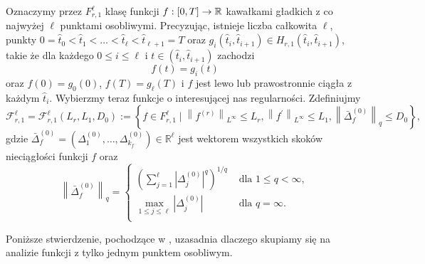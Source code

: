 \documentclass[oik, pdftex, man]{mgrwms}
\begin{document}
    Oznaczymy przez $F_{r, 1}^{\ell}$ klasę funkcji $f: [0,T] \rightarrow \mathbb{R}$ kawałkami gładkich z co najwyżej $\ell$ punktami osobliwymi. Precyzując, istnieje liczba całkowita $\ell$, punkty $0 = \hat{t}_{0} < \hat{t}_{1} < \ldots < \hat{t}_{\ell} < \hat{t}_{\ell + 1} = T$ oraz $g_{i}(\hat{t}_{i}, \hat{t}_{i+1}) \in H_{r, 1}(\hat{t}_{i},\hat{t}_{i+1})$, takie że dla każdego $0 \leq i \leq \ell$ i $t \in (\hat{t}_{i}, \hat{t}_{i+1})$ zachodzi
    \begin{equation*}
        f(t) = g_{i}(t)
    \end{equation*}
    oraz $f(0) = g_{0}(0)$, $f(T) = g_{\ell}(T)$ i $f$ jest lewo lub prawostronnie ciągła z każdym $\hat{t}_{i}$.
    Wybierzmy teraz funkcje o interesującej nas regularności. Zdefiniujmy
    \begin{equation*}
        \mathcal{F}_{r, 1}^{\ell}=\mathcal{F}_{r, 1}^{\ell}\left(L_{r}, L_{1}, D_{0}\right):=\left\{f \in F_{r, 1}^{\ell} \mid\left\|f^{(r)}\right\|_{L^{\infty}} \leq L_{r},\left\|f^{\prime}\right\|_{L^{\infty}} \leq L_{1},\left\|\bar{\Delta}_{f}^{(0)}\right\|_{q} \leq D_{0}\right\},
    \end{equation*}
    gdzie $\bar{\Delta}_{f}^{(0)}=\left(\Delta_{1}^{(0)}, \ldots, \Delta_{k_{f}}^{(0)}\right) \in \mathbb{R}^{\ell}$ jest wektorem wszystkich skoków nieciągłości funkcji $f$ oraz
    \begin{equation*}
        \left\|\bar{\Delta}_{f}^{(0)}\right\|_{q}=\begin{cases}
            \displaystyle \left(\sum_{j=1}^{\ell}\left|\Delta_{j}^{(0)}\right|^{q}\right)^{1 / q}   & \text { dla } 1 \leq q< \infty, \\
            \displaystyle \max _{1 \leq j \leq \ell}\left|\Delta_{j}^{(0)}\right|                   & \text { dla } q = \infty. \\
        \end{cases}
    \end{equation*}
    
    Poniższe stwierdzenie, pochodzące w \cite{PoA}, uzasadnia dlaczego skupiamy się na analizie funkcji z tylko jednym punktem osobliwym.
\end{document}
